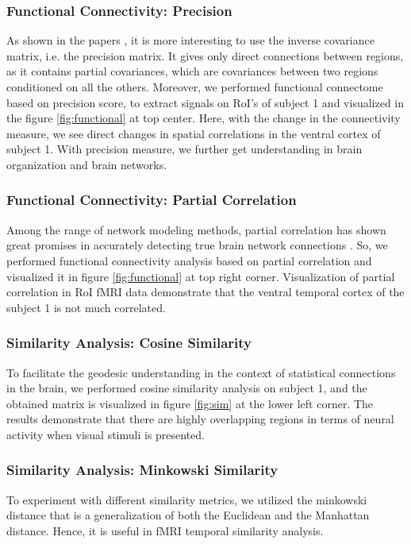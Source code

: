\documentclass[10pt, twocolumn, letterpaper]{article}
\begin{document}
\subsubsection{Functional Connectivity: Precision}
As shown in the papers \cite{smith2011network, varoquaux2010brain}, it is more interesting to use the inverse covariance matrix, i.e. the precision matrix. It gives only direct connections between regions, as it contains partial covariances, which are covariances between two regions conditioned on all the others. Moreover, we performed functional connectome based on precision score, to extract signals on RoI's of subject 1 and visualized in the figure \ref{fig:functional} at top center. Here, with the change in the connectivity measure, we see direct changes in spatial correlations in the ventral cortex of subject 1. With precision measure, we further get understanding in brain organization and brain networks. 

\subsubsection{Functional Connectivity: Partial Correlation}
Among the range of network modeling methods, partial correlation has shown great promises in accurately detecting true brain network connections \cite{wang2016efficient}. So, we performed functional connectivity analysis based on partial correlation and visualized it in figure \ref{fig:functional} at top right corner. Visualization of partial correlation in RoI fMRI data demonstrate that the ventral temporal cortex of the subject 1 is not much correlated.  

\subsubsection{Similarity Analysis: Cosine Similarity}
To facilitate the geodesic understanding in the context of statistical connections in the brain, we performed cosine similarity analysis on subject 1, and the obtained matrix is visualized in figure \ref{fig:sim} at the lower left corner. The results demonstrate that there are highly overlapping regions in terms of neural activity when visual stimuli is presented. 

\subsubsection{Similarity Analysis: Minkowski Similarity}
To experiment with different similarity metrics, we utilized the minkowski distance that is a generalization of both the Euclidean and the Manhattan distance. Hence, it is useful in fMRI temporal similarity analysis.
\end{document}
